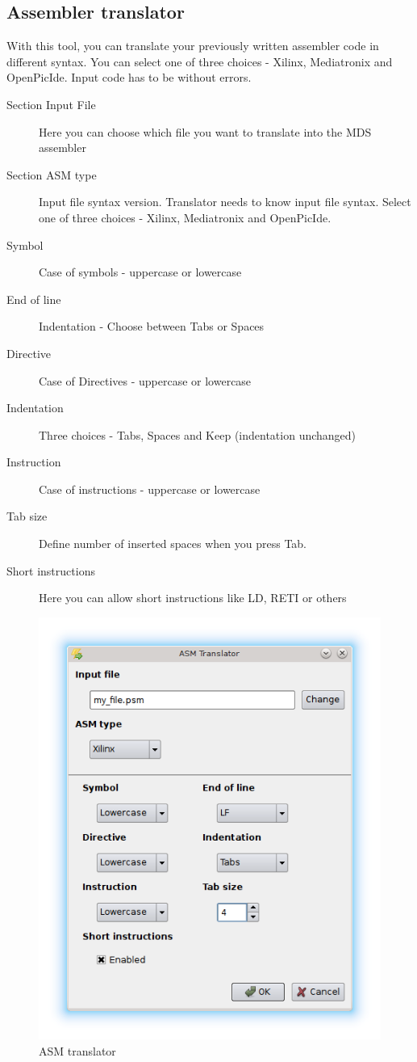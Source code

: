 \subsection{Assembler translator}
    With this tool, you can translate your previously written assembler code in different syntax.
    You can select one of three choices - Xilinx, Mediatronix and OpenPicIde. Input code has to be without
    errors.
    \begin{description}
        \item[Section Input File] Here you can choose which file you want to translate into the MDS assembler
        \item[Section ASM type] Input file syntax version. Translator needs to know input file syntax. Select one of
             three choices - Xilinx, Mediatronix and OpenPicIde.
        \item[Symbol] Case of symbols - uppercase or lowercase
        \item[End of line] Indentation - Choose between Tabs or Spaces
        \item[Directive] Case of Directives - uppercase or lowercase
        \item[Indentation] Three choices - Tabs, Spaces and Keep (indentation unchanged)
        \item[Instruction] Case of instructions - uppercase or lowercase
        \item[Tab size]  Define number of inserted spaces when you press Tab.
        \item[Short instructions] Here you can allow short instructions like LD, RETI or others
    \end{description}

    \begin{figure}[h]
        \centering
        \includegraphics[width=.5\textwidth]{img/ASM_translator.png}
        \caption{ASM translator}
    \end{figure}

